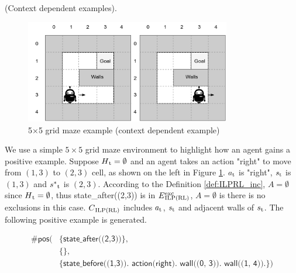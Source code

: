 \begin{examp} \normalfont (Context dependent examples).

\begin{figure}[!htb]
\centering
\includegraphics[width=0.8\textwidth]{./figures/env_context_example}
\caption{5$\times$5 grid maze example (context dependent example)}
\label{example_pos_example}
\end{figure}

We use a simple $5 \times 5$ grid maze environment to highlight how an agent gains a positive example.
Suppose $H\textsubscript{t}=\emptyset$ and an agent takes an action "right" to move from $(1,3)$ to $(2,3)$ cell, as shown on the left in Figure \ref{example_pos_example}.
$a\textsubscript{t}$ is "right", $s\textsubscript{t}$ is $(1,3)$ and $s^*\textsubscript{t}$ is $(2,3)$.
According to the Definition \ref{def:ILPRL_inc}, $A=\emptyset$ since $H\textsubscript{t}=\emptyset$, thus \textsf{state\_after((2,3))} is in $E\SPSB{exc}{ILP(RL)}$, $A=\emptyset$ is there is no exclusions in this case.
$C\textsubscript{ILP(RL)}$ includes $a\textsubscript{t}$, $s\textsubscript{t}$ and adjacent walls of $s\textsubscript{t}$.
The following positive example is generated.

\begin{equation}
\begin{split}
    \textsf{\#pos(} & \textsf{\{state\_after((2,3))\},}\\
                    & \textsf{\{\},} \\
    & \textsf{\{state\_before((1,3)). action(right). wall((0, 3)). wall((1, 4)).\})}
\end{split}
\end{equation}


\end{examp}

